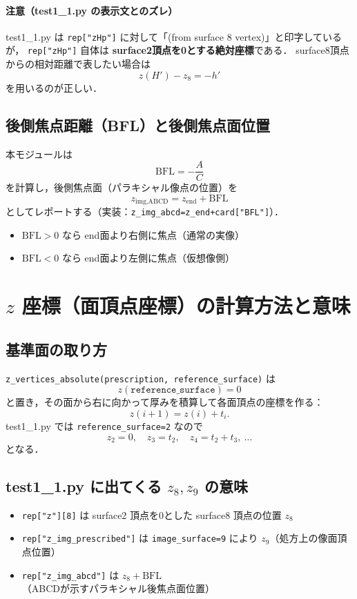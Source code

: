 \documentclass[a4paper,11pt]{jsarticle} %
\begin{document}
\paragraph{注意（test1\_1.py の表示文とのズレ）}
test1\_1.py は \texttt{rep["zHp"]} に対して「(from surface 8 vertex)」と印字しているが，
\texttt{rep["zHp"]} 自体は \textbf{surface2頂点を0とする絶対座標}である．
surface8頂点からの相対距離で表したい場合は
\[
z(H')-z_8 = -h'
\]
を用いるのが正しい．

\subsection{後側焦点距離（BFL）と後側焦点面位置}
本モジュールは
\[
\mathrm{BFL}=-\frac{A}{C}
\]
を計算し，後側焦点面（パラキシャル像点の位置）を
\[
z_{\text{img,ABCD}} = z_{\text{end}} + \mathrm{BFL}
\]
としてレポートする（実装：\texttt{z\_img\_abcd=z\_end+card["BFL"]}）．

\begin{itemize}
  \item $\mathrm{BFL}>0$ なら end面より右側に焦点（通常の実像）
  \item $\mathrm{BFL}<0$ なら end面より左側に焦点（仮想像側）
\end{itemize}

\section{$z$ 座標（面頂点座標）の計算方法と意味}

\subsection{基準面の取り方}
\texttt{z\_vertices\_absolute(prescription, reference\_surface)} は
\[
z(\texttt{reference\_surface})=0
\]
と置き，その面から右に向かって厚みを積算して各面頂点の座標を作る：
\[
z(i+1)=z(i)+t_i.
\]
test1\_1.py では \texttt{reference\_surface=2} なので
\[
z_2=0,\quad
z_3=t_2,\quad
z_4=t_2+t_3,\ \dots
\]
となる．

\subsection{test1\_1.py に出てくる $z_8, z_9$ の意味}
\begin{itemize}
  \item \texttt{rep["z"][8]} は surface2 頂点を0とした surface8 頂点の位置 $z_8$
  \item \texttt{rep["z\_img\_prescribed"]} は \texttt{image\_surface=9} により $z_9$（処方上の像面頂点位置）
  \item \texttt{rep["z\_img\_abcd"]} は $z_8+\mathrm{BFL}$（ABCDが示すパラキシャル後焦点面位置）
\end{itemize}
\end{document}
